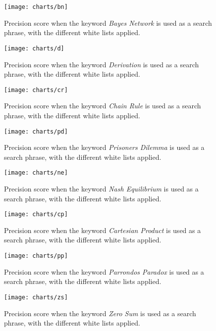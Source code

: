 \begin{figure}[h] 
\caption{Precision score when the keyword \textit{Bayes Network} is used as a search phrase, with the different white lists applied.}
\texttt{[image: charts/bn]}
\label{fig:bn}
\end{figure}

\begin{figure}[h] 
\caption{Precision score when the keyword \textit{Derivation} is used as a search phrase, with the different white lists applied.}
\texttt{[image: charts/d]}
\label{fig:d}
\end{figure}

\begin{figure}[h] 
\caption{Precision score when the keyword \textit{Chain Rule} is used as a search phrase, with the different white lists applied.}
\texttt{[image: charts/cr]}
\label{fig:cr}
\end{figure}

\begin{figure}[h] 
\caption{Precision score when the keyword \textit{Prisoners Dilemma} is used as a search phrase, with the different white lists applied.}
\texttt{[image: charts/pd]}
\label{fig:pd}
\end{figure}

\begin{figure}[h] 
\caption{Precision score when the keyword \textit{Nash Equilibrium} is used as a search phrase, with the different white lists applied.}
\texttt{[image: charts/ne]}
\label{fig:ne}
\end{figure}

\begin{figure}[h] 
\caption{Precision score when the keyword \textit{Cartesian Product} is used as a search phrase, with the different white lists applied.}
\texttt{[image: charts/cp]}
\label{fig:cp}
\end{figure}

\begin{figure}[h] 
\caption{Precision score when the keyword \textit{Parrondos Paradox} is used as a search phrase, with the different white lists applied.}
\texttt{[image: charts/pp]}
\label{fig:pp}
\end{figure}

\begin{figure}[h] 
\caption{Precision score when the keyword \textit{Zero Sum} is used as a search phrase, with the different white lists applied.}
\texttt{[image: charts/zs]}
\label{fig:zs}
\end{figure}


